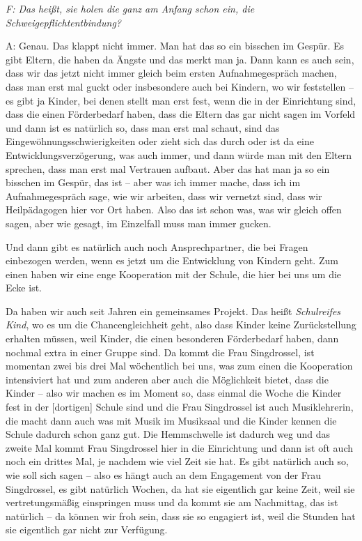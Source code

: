 \begin{linenumbers*}
\emph{F: Das heißt, sie holen die ganz am Anfang schon ein, die Schweigepflichtentbindung?}

A: Genau. Das klappt nicht immer. Man hat das so ein bisschen im Gespür. Es gibt Eltern, die haben da Ängste und das merkt man ja. Dann kann es auch sein, dass wir das jetzt nicht immer gleich beim ersten Aufnahmegespräch machen, dass man erst mal guckt oder insbesondere auch bei Kindern, wo wir feststellen -- es gibt ja Kinder, bei denen stellt man erst fest, wenn die in der Einrichtung sind, dass die einen Förderbedarf haben, dass die Eltern das gar nicht sagen im Vorfeld und dann ist es natürlich so, dass man erst mal schaut, sind das Eingewöhnungsschwierigkeiten oder zieht sich das durch oder ist da eine Entwicklungsverzögerung, was auch immer, und dann würde man mit den Eltern sprechen, dass man erst mal Vertrauen aufbaut. Aber das hat man ja so ein bisschen im Gespür, das ist -- aber was ich immer mache, dass ich im Aufnahmegespräch sage, wie wir arbeiten, dass wir vernetzt sind, dass wir Heilpädagogen hier vor Ort haben. Also das ist schon was, was wir gleich offen sagen, aber wie gesagt, im Einzelfall muss man immer gucken.
      
Und dann gibt es natürlich auch noch Ansprechpartner, die bei Fragen einbezogen werden, wenn es jetzt um die Entwicklung von Kindern geht. Zum einen haben wir eine enge Kooperation mit der Schule, die hier bei uns um die Ecke ist. 

Da haben wir auch seit Jahren ein gemeinsames Projekt. Das heißt \emph{Schulreifes Kind}, wo es um die Chancengleichheit geht, also dass Kinder keine Zurückstellung erhalten müssen, weil Kinder, die einen besonderen Förderbedarf haben, dann nochmal extra in einer Gruppe sind. Da kommt die Frau Singdrossel, ist momentan zwei bis drei Mal wöchentlich bei uns, was zum einen die Kooperation intensiviert hat und zum anderen aber auch die Möglichkeit bietet, dass die Kinder -- also wir machen es im Moment so, dass einmal die Woche die Kinder fest in der [dortigen] Schule sind und die Frau Singdrossel ist auch Musiklehrerin, die macht dann auch was mit Musik im Musiksaal und die Kinder kennen die Schule dadurch schon ganz gut. Die Hemmschwelle ist dadurch weg und das zweite Mal kommt Frau Singdrossel hier in die Einrichtung und dann ist oft auch noch ein drittes Mal, je nachdem wie viel Zeit sie hat. Es gibt natürlich auch so, wie soll sich sagen -- also es hängt auch an dem Engagement von der Frau Singdrossel, es gibt natürlich Wochen, da hat sie eigentlich gar keine Zeit, weil sie vertretungsmäßig einspringen muss und da kommt sie am Nachmittag, das ist natürlich -- da können wir froh sein, dass sie so engagiert ist, weil die Stunden hat sie eigentlich gar nicht zur Verfügung. 


\end{linenumbers*}
